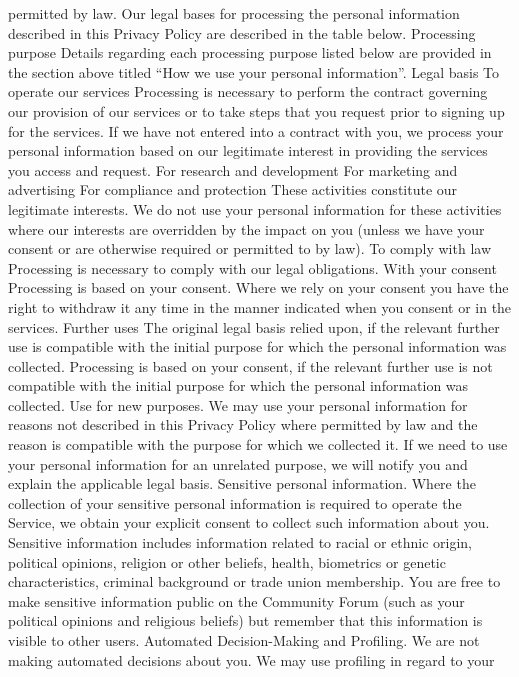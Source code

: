 permitted by law. Our legal bases for processing the personal
information described in this Privacy Policy are described in the table
below.
Processing purpose
Details regarding each processing
purpose listed below are provided in
the section above titled “How we use
your personal information”.
Legal basis
To operate our services
Processing is necessary to perform the contract governing our provision
of our services or to take steps that you request prior to signing up for the
services. If we have not entered into a contract with you, we process your
personal information based on our legitimate interest in providing the
services you access and request.
For research and development
For marketing and advertising
For compliance and protection
These activities constitute our legitimate interests. We do not use your
personal information for these activities where our interests are
overridden by the impact on you (unless we have your consent or are
otherwise required or permitted to by law).
To comply with law Processing is necessary to comply with our legal obligations.
With your consent
Processing is based on your consent. Where we rely on your consent you
have the right to withdraw it any time in the manner indicated when you
consent or in the services.
Further uses
The original legal basis relied upon, if the relevant further use is
compatible with the initial purpose for which the personal information was
collected.
Processing is based on your consent, if the relevant further use is not
compatible with the initial purpose for which the personal information was
collected.
Use for new purposes. We may use your personal information for
reasons not described in this Privacy Policy where permitted by law and
the reason is compatible with the purpose for which we collected it. If
we need to use your personal information for an unrelated purpose, we
will notify you and explain the applicable legal basis.
Sensitive personal information. Where the collection of your sensitive
personal information is required to operate the Service, we obtain your
explicit consent to collect such information about you. Sensitive
information includes information related to racial or ethnic origin,
political opinions, religion or other beliefs, health, biometrics or genetic
characteristics, criminal background or trade union membership. You
are free to make sensitive information public on the Community Forum
(such as your political opinions and religious beliefs) but remember that
this information is visible to other users.
Automated Decision-Making and Profiling. We are not making
automated decisions about you. We may use profiling in regard to your
